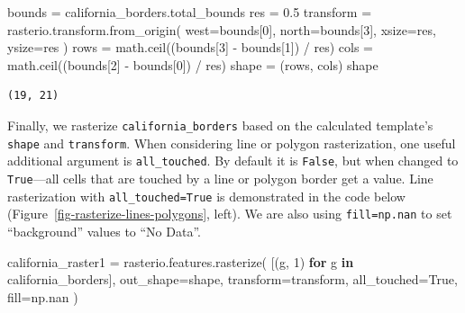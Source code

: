 \documentclass[
  letterpaper,
]{krantz}
\newenvironment{Shaded}{\begin{snugshade}}{\end{snugshade}}
\newcommand{\ControlFlowTok}[1]{\textcolor[rgb]{0.00,0.23,0.31}{\textbf{#1}}}
\newcommand{\DecValTok}[1]{\textcolor[rgb]{0.68,0.00,0.00}{#1}}
\newcommand{\FloatTok}[1]{\textcolor[rgb]{0.68,0.00,0.00}{#1}}
\newcommand{\KeywordTok}[1]{\textcolor[rgb]{0.00,0.23,0.31}{\textbf{#1}}}
\newcommand{\NormalTok}[1]{\textcolor[rgb]{0.00,0.23,0.31}{#1}}
\newcommand{\OperatorTok}[1]{\textcolor[rgb]{0.37,0.37,0.37}{#1}}
\newcommand{\VariableTok}[1]{\textcolor[rgb]{0.07,0.07,0.07}{#1}}
\begin{document}
\begin{Shaded}
\begin{Highlighting}[]
\NormalTok{bounds }\OperatorTok{=}\NormalTok{ california\_borders.total\_bounds}
\NormalTok{res }\OperatorTok{=} \FloatTok{0.5}
\NormalTok{transform }\OperatorTok{=}\NormalTok{ rasterio.transform.from\_origin(}
\NormalTok{    west}\OperatorTok{=}\NormalTok{bounds[}\DecValTok{0}\NormalTok{], }
\NormalTok{    north}\OperatorTok{=}\NormalTok{bounds[}\DecValTok{3}\NormalTok{], }
\NormalTok{    xsize}\OperatorTok{=}\NormalTok{res, }
\NormalTok{    ysize}\OperatorTok{=}\NormalTok{res}
\NormalTok{)}
\NormalTok{rows }\OperatorTok{=}\NormalTok{ math.ceil((bounds[}\DecValTok{3}\NormalTok{] }\OperatorTok{{-}}\NormalTok{ bounds[}\DecValTok{1}\NormalTok{]) }\OperatorTok{/}\NormalTok{ res)}
\NormalTok{cols }\OperatorTok{=}\NormalTok{ math.ceil((bounds[}\DecValTok{2}\NormalTok{] }\OperatorTok{{-}}\NormalTok{ bounds[}\DecValTok{0}\NormalTok{]) }\OperatorTok{/}\NormalTok{ res)}
\NormalTok{shape }\OperatorTok{=}\NormalTok{ (rows, cols)}
\NormalTok{shape}
\end{Highlighting}
\end{Shaded}

\begin{verbatim}
(19, 21)
\end{verbatim}

Finally, we rasterize \texttt{california\_borders} based on the
calculated template's \texttt{shape} and \texttt{transform}. When
considering line or polygon rasterization, one useful additional
argument is \texttt{all\_touched}. By default it is \texttt{False}, but
when changed to \texttt{True}---all cells that are touched by a line or
polygon border get a value. Line rasterization with
\texttt{all\_touched=True} is demonstrated in the code below
(Figure~\ref{fig-rasterize-lines-polygons}, left). We are also using
\texttt{fill=np.nan} to set ``background'' values to ``No Data''.

\begin{Shaded}
\begin{Highlighting}[]
\NormalTok{california\_raster1 }\OperatorTok{=}\NormalTok{ rasterio.features.rasterize(}
\NormalTok{    [(g, }\DecValTok{1}\NormalTok{) }\ControlFlowTok{for}\NormalTok{ g }\KeywordTok{in}\NormalTok{ california\_borders],}
\NormalTok{    out\_shape}\OperatorTok{=}\NormalTok{shape,}
\NormalTok{    transform}\OperatorTok{=}\NormalTok{transform,}
\NormalTok{    all\_touched}\OperatorTok{=}\VariableTok{True}\NormalTok{,}
\NormalTok{    fill}\OperatorTok{=}\NormalTok{np.nan}
\NormalTok{)}
\end{Highlighting}
\end{Shaded}
\end{document}
